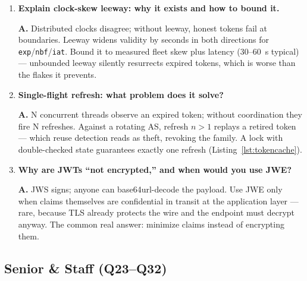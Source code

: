\begin{enumerate}[label=\textbf{Q\arabic*.}, leftmargin=1.7cm, itemsep=0.9em, start=11]
        (\texttt{../../}, \texttt{' OR 1=1 --}). Fix: \texttt{kid} is an
        opaque key into an in-memory map populated exclusively from the
        trusted JWKS document; unknown \texttt{kid} triggers one rate-limited
        JWKS refresh, then rejection.
  \item \textbf{Explain clock-skew leeway: why it exists and how to bound
        it.}\par
        \textbf{A.} Distributed clocks disagree; without leeway, honest
        tokens fail at boundaries. Leeway widens validity by seconds in both
        directions for \texttt{exp}/\texttt{nbf}/\texttt{iat}. Bound it to
        measured fleet skew plus latency (30--60~s typical) --- unbounded
        leeway silently resurrects expired tokens, which is worse than the
        flakes it prevents.
  \item \textbf{Single-flight refresh: what problem does it solve?}\par
        \textbf{A.} N concurrent threads observe an expired token; without
        coordination they fire N refreshes. Against a rotating AS, refresh
        $n>1$ replays a retired token --- which reuse detection reads as
        theft, revoking the family. A lock with double-checked state
        guarantees exactly one refresh (Listing~\ref{lst:tokencache}).
  \item \textbf{Why are JWTs ``not encrypted,'' and when would you use
        JWE?}\par
        \textbf{A.} JWS signs; anyone can base64url-decode the payload. Use
        JWE only when claims themselves are confidential in transit at the
        application layer --- rare, because TLS already protects the wire
        and the endpoint must decrypt anyway. The common real answer:
        minimize claims instead of encrypting them.
\end{enumerate}

\subsection*{Senior \& Staff (Q23--Q32)}

